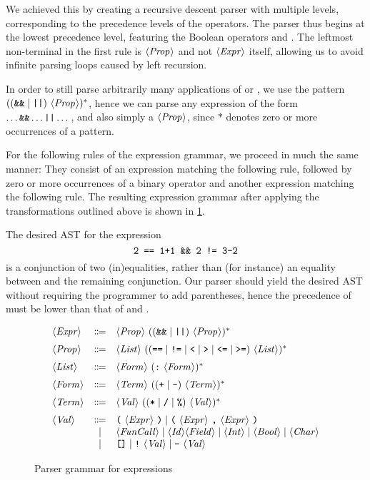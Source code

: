 We achieved this by creating a recursive descent parser with multiple levels,
corresponding to the precedence levels of the operators.
The parser thus begins at the lowest precedence level, featuring the Boolean
operators \code{\&\&} and \code{||}.
The leftmost non-terminal in the first rule is $\langle \textit{Prop}\kern.7pt \rangle$ and not $\langle \textit{Expr}\kern.7pt \rangle$
itself, allowing us to avoid infinite parsing loops caused by left recursion.

In order to still parse arbitrarily many applications of \code{\&\&} or
\code{||}, we use the pattern $((\texttt{\&\&} \mid \texttt{||})\ \langle \textit{Prop}\kern.7pt \rangle)^*$,
hence we can parse any expression of the form $\dots \texttt{\&\&} \dots \texttt{||} \dots$,
and also simply a $\langle \textit{Prop}\kern.7pt \rangle$, since $*$ denotes zero or more occurrences of
a pattern.

For the following rules of the expression grammar, we proceed in much the same
manner: They consist of an expression matching the following rule, followed
by zero or more occurrences of a binary operator and another expression matching
the following rule. The resulting expression grammar after applying the
transformations outlined above is shown in \cref{fig:new-expr-grammar}.

The desired AST for the expression
\[ \texttt{2 == 1+1 \&\& 2 != 3-2} \]
is a conjunction of two (in)equalities, rather than (for instance) an equality
between  and the remaining conjunction.
Our parser should yield the desired AST without requiring the programmer to add
parentheses, hence the precedence of \code{\&\&} must be lower than that of
\code{==} and \code{!=}.

\begin{figure}[h]
  \[
  \begin{array}{lcl}
		\NT{Expr} & \Coloneqq & \NT{Prop}\ ((\code{\&\&} \mid \code{||})\ \NT{Prop})^* \br
		\NT{Prop} & \Coloneqq & \NT{List}\ ((\code{==} \mid \code{!=} \mid \code{<} \mid \code{>} \mid \code{<=} \mid \code{>=})\ \NT{List})^* \br
		\NT{List} & \Coloneqq & \NT{Form}\ (\code{:}\ \NT{Form})^* \br
		\NT{Form} & \Coloneqq & \NT{Term}\ (( \code{+} \mid \code{-} )\ \NT{Term})^* \br
		\NT{Term} & \Coloneqq & \NT{Val}\ (( \code{*} \mid \code{/} \mid \code{\%} )\ \NT{Val} )^* \br
		\NT{Val} & \Coloneqq & \code{(}\ \NT{Expr}\ \code{)} \mid \code{(}\ \NT{Expr}\ \code{,}\ \NT{Expr}\ \code{)} \\
		& \mid & \NT{FunCall} \mid \NT{Id} \NT{Field} \mid \NT{Int} \mid \NT{Bool} \mid \NT{Char} \\
		& \mid & \code{[]} \mid \code{!}\ \NT{Val} \mid \code{-}\ \NT{Val}
  \end{array}
  \]
  \caption{Parser grammar for expressions}
  \label{fig:new-expr-grammar}
\end{figure}

